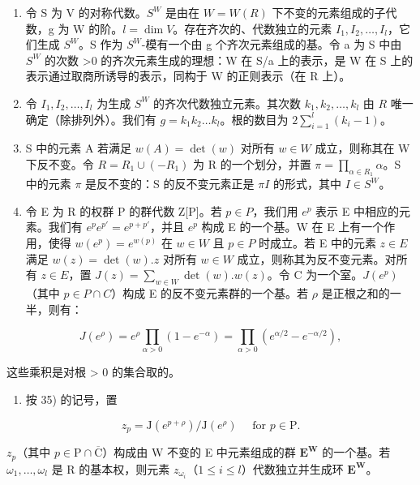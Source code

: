 \begin{enumerate}
\def\labelenumi{\arabic{enumi})}
\setcounter{enumi}{31}
\item
  令 S 为 V 的对称代数。\(S^{W}\) 是由在 \(W = W(R)\) 下不变的元素组成的子代数，g 为 W 的阶。\(l = \dim V\)。存在齐次的、代数独立的元素 \(I_{1}, I_{2}, \ldots, I_{l}\)，它们生成 \(S^{W}\)。S 作为 \(S^{W}\)-模有一个由 g 个齐次元素组成的基。令 a 为 S 中由 \(S^{W}\) 的次数 \textgreater0 的齐次元素生成的理想：W 在 S/a 上的表示，是 W 在 S 上的表示通过取商所诱导的表示，同构于 W 的正则表示（在 R 上）。
\item
  令 \(I_1, I_2, \ldots, I_l\) 为生成 \(S^W\) 的齐次代数独立元素。其次数 \(k_1, k_2, \ldots, k_l\) 由 \(R\) 唯一确定（除排列外）。我们有 \(g = k_1k_2\ldots k_l\)。根的数目为 \(2\sum_{i=1}^{l}(k_i - 1)\)。
\item
  S 中的元素 A 若满足 \(w(A) = \det(w)\) 对所有 \(w \in W\) 成立，则称其在 W 下反不变。令 \(R = R_{1} \cup (-R_{1})\) 为 R 的一个划分，并置 \(\pi = \prod_{\alpha \in R_{1}} \alpha\)。S 中的元素 \(\pi\) 是反不变的：S 的反不变元素正是 \(\pi I\) 的形式，其中 \(I \in S^{W}\)。
\item
  令 E 为 R 的权群 P 的群代数 Z[P]。若 \(p \in P\)，我们用 \(e^{p}\) 表示 E 中相应的元素。我们有 \(e^{p}e^{p'} = e^{p+p'}\)，并且 \(e^{p}\) 构成 E 的一个基。W 在 E 上有一个作用，使得 \(w(e^{p}) = e^{w(p)}\) 在 \(w \in W\) 且 \(p \in P\) 时成立。若 E 中的元素 \(z \in E\) 满足 \(w(z) = \det(w).z\) 对所有 \(w \in W\) 成立，则称其为反不变元素。对所有 \(z \in E\)，置 \(J(z) = \sum_{w \in W} \det(w).w(z)\)。令 C 为一个室。\(J(e^{p})\)（其中 \(p \in P \cap C\)）构成 E 的反不变元素群的一个基。若 \(\rho\) 是正根之和的一半，则有：
\end{enumerate}

\[
J \left(e ^ {\rho}\right) = e ^ {\rho} \prod_ {\alpha > 0} \left(1 - e ^ {- \alpha}\right) = \prod_ {\alpha > 0} \left(e ^ {\alpha / 2} - e ^ {- \alpha / 2}\right),
\]

这些乘积是对根 \textgreater{} 0 的集合取的。

\begin{enumerate}
\def\labelenumi{\arabic{enumi})}
\setcounter{enumi}{35}
\tightlist
\item
按 35) 的记号，置
\end{enumerate}

\[
z _ {p} = \mathrm{J} (e ^ {p + \rho}) / \mathrm{J} (e ^ {\rho}) \quad \text { for } p \in \mathrm{P}.
\]

\(z_{p}\)（其中 \(p \in \mathrm{P} \cap \overline{\mathrm{C}}\)）构成由 W 不变的 E 中元素组成的群 \(\mathbf{E}^{\mathbf{W}}\) 的一个基。若 \(\omega_{1}, \ldots, \omega_{l}\) 是 R 的基本权，则元素 \(z_{\omega_{i}}\)（\(1 \leqslant i \leqslant l\)）代数独立并生成环 \(\mathbf{E}^{\mathbf{W}}\)。

